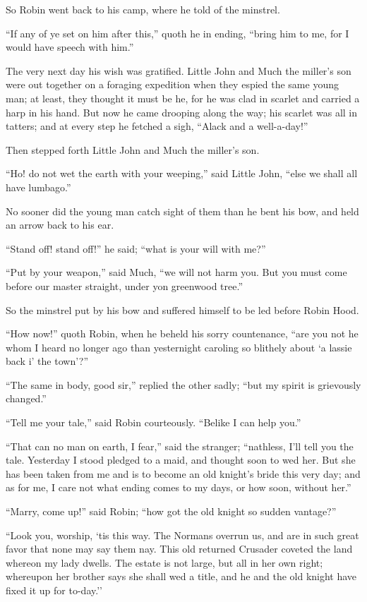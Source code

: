 So Robin went back to his camp, where he told of the minstrel.

``If any of ye set on him after this,'' quoth he in ending, ``bring him
to me, for I would have speech with him.''

The very next day his wish was gratified. Little John and Much the
miller's son were out together on a foraging expedition when they espied
the same young man; at least, they thought it must be he, for he was
clad in scarlet and carried a harp in his hand. But now he came drooping
along the way; his scarlet was all in tatters; and at every step he
fetched a sigh, ``Alack and a well-a-day!''

Then stepped forth Little John and Much the miller's son.

``Ho! do not wet the earth with your weeping,'' said Little John, ``else
we shall all have lumbago.''

No sooner did the young man catch sight of them than he bent his bow,
and held an arrow back to his ear.

``Stand off! stand off!'' he said; ``what is your will with me?''

``Put by your weapon,'' said Much, ``we will not harm you. But you must
come before our master straight, under yon greenwood tree.''

So the minstrel put by his bow and suffered himself to be led before
Robin Hood.

``How now!'' quoth Robin, when he beheld his sorry countenance, ``are
you not he whom I heard no longer ago than yesternight caroling so
blithely about `a lassie back i' the town'?''

``The same in body, good sir,'' replied the other sadly; ``but my spirit
is grievously changed.''

``Tell me your tale,'' said Robin courteously. ``Belike I can help
you.''

``That can no man on earth, I fear,'' said the stranger; ``nathless,
I'll tell you the tale. Yesterday I stood pledged to a maid, and thought
soon to wed her. But she has been taken from me and is to become an old
knight's bride this very day; and as for me, I care not what ending
comes to my days, or how soon, without her.''

``Marry, come up!'' said Robin; ``how got the old knight so sudden
vantage?''

``Look you, worship, `tis this way. The Normans overrun us, and are in
such great favor that none may say them nay. This old returned Crusader
coveted the land whereon my lady dwells. The estate is not large, but
all in her own right; whereupon her brother says she shall wed a title,
and he and the old knight have fixed it up for to-day.''

